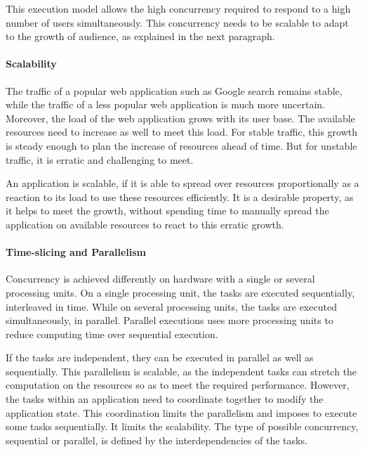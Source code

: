 This execution model allows the high concurrency required to respond to a high number of users simultaneously.
This concurrency needs to be scalable to adapt to the growth of audience, as explained in the next paragraph.

\paragraph{Scalability}

The traffic of a popular web application such as Google search remains stable, while the traffic of a less popular web application is much more uncertain.
Moreover, the load of the web application grows with its user base.
The available resources need to increase as well to meet this load.
For stable traffic, this growth is steady enough to plan the increase of resources ahead of time.
But for unstable traffic, it is erratic and challenging to meet.

An application is scalable, if it is able to spread over resources proportionally as a reaction to its load to use these resources efficiently.
It is a desirable property, as it helps to meet the growth, without spending time to manually spread the application on available resources to react to this erratic growth.

\paragraph{Time-slicing and Parallelism}

Concurrency is achieved differently on hardware with a single or several processing units.
On a single processing unit, the tasks are executed sequentially, interleaved in time.
While on several processing units, the tasks are executed simultaneously, in parallel.
Parallel executions uses more processing units to reduce computing time over sequential execution.

If the tasks are independent, they can be executed in parallel as well as sequentially.
This parallelism is scalable, as the independent tasks can stretch the computation on the resources so as to meet the required performance.
However, the tasks within an application need to coordinate together to modify the application state.
This coordination limits the parallelism and imposes to execute some tasks sequentially.
It limits the scalability.
The type of possible concurrency, sequential or parallel, is defined by the interdependencies of the tasks.

